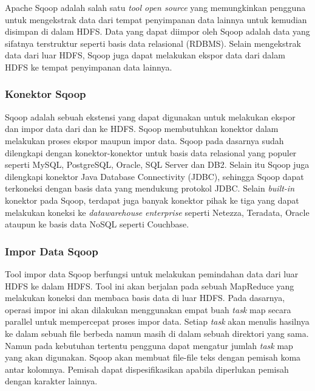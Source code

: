 Apache Sqoop adalah salah satu \textit{tool open source} yang memungkinkan pengguna untuk mengekstrak data dari tempat penyimpanan data lainnya untuk kemudian disimpan di dalam HDFS. Data yang dapat diimpor oleh Sqoop adalah data yang sifatnya terstruktur seperti basis data relasional (RDBMS). Selain mengekstrak data dari luar HDFS, Sqoop juga dapat melakukan ekspor data dari dalam HDFS ke tempat penyimpanan data lainnya.

\subsubsection{Konektor Sqoop}
\label{sec:konektor_sqoop}
Sqoop adalah sebuah ekstensi yang dapat digunakan untuk melakukan ekspor dan impor data dari dan ke HDFS. Sqoop membutuhkan konektor dalam melakukan proses ekspor maupun impor data. Sqoop pada dasarnya sudah dilengkapi dengan konektor-konektor untuk basis data relasional yang populer seperti MySQL, PostgreSQL, Oracle, SQL Server dan DB2. Selain itu Sqoop juga dilengkapi konektor Java Database Connectivity (JDBC), sehingga Sqoop dapat terkoneksi dengan basis data yang  mendukung protokol JDBC. Selain \textit{built-in} konektor pada Sqoop, terdapat juga banyak konektor pihak ke tiga yang dapat melakukan koneksi ke \textit{datawarehouse} \textit{enterprise} seperti Netezza, Teradata, Oracle ataupun ke basis data NoSQL seperti Couchbase. 

\subsubsection{Impor Data Sqoop}
\label{sec:impor_data_sqoop}
Tool impor data Sqoop berfungsi untuk melakukan pemindahan data dari luar HDFS ke dalam HDFS. Tool ini akan berjalan pada sebuah MapReduce yang melakukan koneksi dan membaca basis data di luar HDFS. Pada dasarnya, operasi impor ini akan dilakukan menggunakan empat buah \textit{task} map secara parallel untuk mempercepat proses impor data. Setiap \textit{task}  akan menulis hasilnya ke dalam sebuah file berbeda namun masih di dalam sebuah direktori yang sama. Namun pada kebutuhan tertentu pengguna dapat mengatur jumlah \textit{task} map yang akan digunakan. Sqoop akan membuat file-file teks dengan pemisah koma antar kolomnya. Pemisah dapat dispesifikasikan apabila diperlukan pemisah dengan karakter lainnya. 

